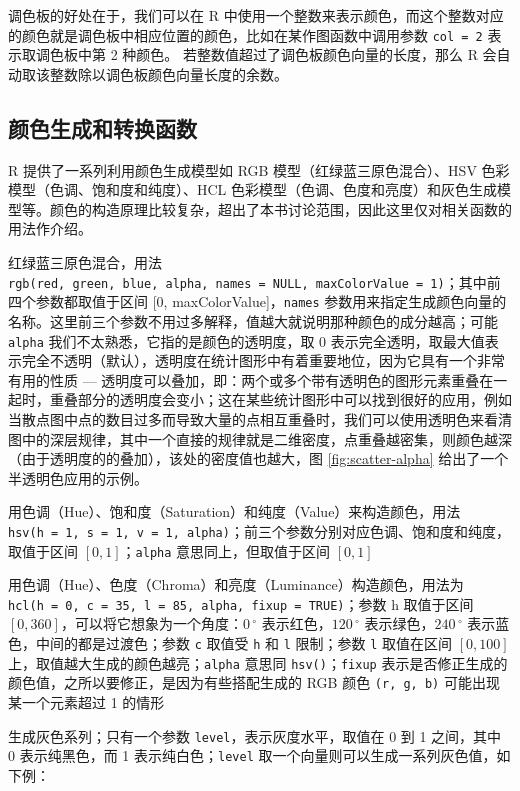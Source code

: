 \documentclass[
  b5paper,
  UTF8,twoside]{book}
\providecommand{\tightlist}{%
  \setlength{\itemsep}{0pt}\setlength{\parskip}{0pt}}
\begin{document}
调色板的好处在于，我们可以在 R 中使用一个整数来表示颜色，而这个整数对应的颜色就是调色板中相应位置的颜色，比如在某作图函数中调用参数 \texttt{col\ =\ 2} 表示取调色板中第 2 种颜色。 若整数值超过了调色板颜色向量的长度，那么 R 会自动取该整数除以调色板颜色向量长度的余数。

\hypertarget{ux989cux8272ux751fux6210ux548cux8f6cux6362ux51fdux6570}{%
\subsection{颜色生成和转换函数}\label{ux989cux8272ux751fux6210ux548cux8f6cux6362ux51fdux6570}}

R 提供了一系列利用颜色生成模型如 RGB 模型（红绿蓝三原色混合）、HSV 色彩模型（色调、饱和度和纯度）、HCL 色彩模型（色调、色度和亮度）和灰色生成模型等。颜色的构造原理比较复杂，超出了本书讨论范围，因此这里仅对相关函数的用法作介绍。

\begin{description}
\tightlist
\item[\texttt{rgb()}]
红绿蓝三原色混合，用法 \texttt{rgb(red,\ green,\ blue,\ alpha,\ names\ =\ NULL,\ maxColorValue\ =\ 1)}；其中前四个参数都取值于区间 {[}0, maxColorValue{]}，\texttt{names} 参数用来指定生成颜色向量的名称。这里前三个参数不用过多解释，值越大就说明那种颜色的成分越高；可能 \texttt{alpha} 我们不太熟悉，它指的是颜色的透明度，取 0 表示完全透明，取最大值表示完全不透明（默认），透明度在统计图形中有着重要地位，因为它具有一个非常有用的性质 --- 透明度可以叠加，即：两个或多个带有透明色的图形元素重叠在一起时，重叠部分的透明度会变小；这在某些统计图形中可以找到很好的应用，例如当散点图中点的数目过多而导致大量的点相互重叠时，我们可以使用透明色来看清图中的深层规律，其中一个直接的规律就是二维密度，点重叠越密集，则颜色越深（由于透明度的的叠加），该处的密度值也越大，图 \ref{fig:scatter-alpha} 给出了一个半透明色应用的示例。
\item[\texttt{hsv()}]
用色调（Hue）、饱和度（Saturation）和纯度（Value）来构造颜色，用法 \texttt{hsv(h\ =\ 1,\ s\ =\ 1,\ v\ =\ 1,\ alpha)}；前三个参数分别对应色调、饱和度和纯度，取值于区间 \([0, 1]\)；\texttt{alpha} 意思同上，但取值于区间 \([0, 1]\)
\item[\texttt{hcl()}]
用色调（Hue）、色度（Chroma）和亮度（Luminance）构造颜色，用法为 \texttt{hcl(h\ =\ 0,\ c\ =\ 35,\ l\ =\ 85,\ alpha,\ fixup\ =\ TRUE)}；参数 h 取值于区间 \([0, 360]\)，可以将它想象为一个角度：\(0\,^{\circ}\) 表示红色，\(120\,^{\circ}\) 表示绿色，\(240\,^{\circ}\) 表示蓝色，中间的都是过渡色；参数 \texttt{c} 取值受 \texttt{h} 和 \texttt{l} 限制；参数 \texttt{l} 取值在区间 \([0, 100]\) 上，取值越大生成的颜色越亮；\texttt{alpha} 意思同 \texttt{hsv()}；\texttt{fixup} 表示是否修正生成的颜色值，之所以要修正，是因为有些搭配生成的 RGB 颜色 \texttt{(r,\ g,\ b)} 可能出现某一个元素超过 1 的情形
\item[\texttt{gray(),\ grey()}]
生成灰色系列；只有一个参数 \texttt{level}，表示灰度水平，取值在 0 到 1 之间，其中 0 表示纯黑色，而 1 表示纯白色；\texttt{level} 取一个向量则可以生成一系列灰色值，如下例：
\end{description}
\end{document}
